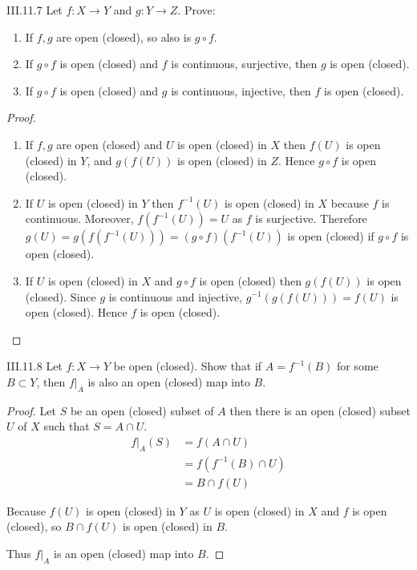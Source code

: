 \begin{problem}{III.11.7}
Let \( f: X \to Y \) and \( g: Y \to Z \). Prove:
\begin{enumerate}[label={(\alph*)}]
    \item If \( f, g \) are open (closed), so also is \( g \circ f \).
    \item If \( g \circ f \) is open (closed) and \( f \) is continuous, surjective, then \( g \) is open (closed).
    \item If \( g \circ f \) is open (closed) and \( g \) is continuous, injective, then \( f \) is open (closed).
\end{enumerate}
\end{problem}

\begin{proof}
    \begin{enumerate}[label={(\alph*)}]
        \item If \( f, g \) are open (closed) and \( U \) is open (closed) in \( X \) then \( f(U) \) is open (closed) in \( Y \), and \( g(f(U)) \) is open (closed) in \( Z \). Hence \( g \circ f \) is open (closed).
        \item If \( U \) is open (closed) in \( Y \) then \( f^{-1}(U) \) is open (closed) in \( X \) because \( f \) is continuous. Moreover, \( f(f^{-1}(U)) = U \) as \( f \) is surjective. Therefore \( g(U) = g(f(f^{-1}(U))) = (g\circ f)(f^{-1}(U)) \) is open (closed) if \( g\circ f \) is open (closed).
        \item If \( U \) is open (closed) in \( X \) and \( g \circ f \) is open (closed) then \( g(f(U)) \) is open (closed). Since \( g \) is continuous and injective, \( g^{-1}(g(f(U))) = f(U) \) is open (closed). Hence \( f \) is open (closed).
    \end{enumerate}
\end{proof}

\begin{problem}{III.11.8}\label{problem:III.11.8}
Let \( f: X \to Y \) be open (closed). Show that if \( A = f^{-1}(B) \) for some \( B \subset Y \), then \( f\vert_{A} \) is also an open (closed) map into \( B \).
\end{problem}

\begin{proof}
    Let \( S \) be an open (closed) subset of \( A \) then there is an open (closed) subset \( U \) of \( X \) such that \( S = A \cap U \).
    \begingroup
    \allowdisplaybreaks%
    \begin{align*}
        f\vert_{A}(S) & = f(A \cap U)         \\
                      & = f(f^{-1}(B) \cap U) \\
                      & = B \cap f(U)
    \end{align*}
    \endgroup

    Because \( f(U) \) is open (closed) in \( Y \) as \( U \) is open (closed) in \( X \) and \( f \) is open (closed), so \( B \cap f(U) \) is open (closed) in \( B \).

    Thus \( f\vert_{A} \) is an open (closed) map into \( B \).
\end{proof}

